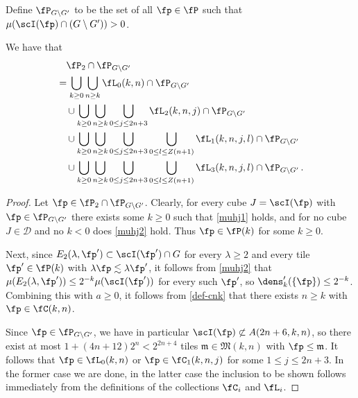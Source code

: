 Define $\fP_{G \setminus G'}$ to be the set of all $\fp \in \fP$ such that $\mu(\scI(\fp) \cap (G \setminus  G')) > 0$.
\begin{lemma}
\label{antichain-decomposition}
    We have that
    \begin{align}
        \label{eq-fp'-decomposition}
        &\quad \fP_2 \cap \fP_{G \setminus G'}\\
        &= \bigcup_{k \ge 0} \bigcup_{n \ge k} \fL_0(k,n) \cap \fP_{G \setminus G'} \\
        &\quad\cup \bigcup_{k \ge 0} \bigcup_{n \ge k}\bigcup_{0 \le j \le 2n+3} \fL_2(k,n,j) \cap \fP_{G \setminus G'}\\
        &\quad\cup \bigcup_{k \ge 0} \bigcup_{n \ge k}\bigcup_{0 \le j \le 2n+3} \bigcup_{0 \le l \le Z(n+1)} \fL_1(k,n,j,l) \cap \fP_{G \setminus G'}\\
        &\quad\cup \bigcup_{k \ge 0} \bigcup_{n \ge k}\bigcup_{0 \le j \le 2n+3} \bigcup_{0 \le l \le Z(n+1)} \fL_3(k,n,j,l)\cap \fP_{G \setminus G'}\,.
    \end{align}
\end{lemma}

\begin{proof}
    Let $\fp \in \fP_2 \cap \fP_{G \setminus G'}$. Clearly, for every cube $J = \scI(\fp)$ with $\fp \in \fP_{G \setminus G'}$ there exists some $k \ge 0$ such that \eqref{muhj1} holds, and for no cube $J \in \mathcal{D}$ and no $k < 0$ does \eqref{muhj2} hold. Thus $\fp \in \fP(k)$ for some $k \ge 0$.

    Next, since $E_2(\lambda, \fp') \subset \scI(\fp')\cap G$ for every $\lambda \ge 2$ and every tile $\fp' \in \fP(k)$ with $\lambda\fp \lesssim \lambda \fp'$, it follows from \eqref{muhj2} that $\mu(E_2(\lambda, \fp')) \le 2^{-k} \mu(\scI(\fp'))$ for every such $\fp'$, so $\dens_k'(\{\fp\}) \le 2^{-k}$. Combining this with $a \ge 0$, it follows from \eqref{def-cnk} that there exists $n\ge k$ with $\fp \in \fC(k,n)$.

    Since $\fp \in \fP_{G \setminus G'}$, we have in particular $\scI(\fp) \not \subset A(2n + 6, k, n)$, so there exist at most $1 + (4n + 12)2^n < 2^{2n+4}$ tiles $\mathfrak{m} \in \mathfrak{M}(k,n)$ with $\fp \le \mathfrak{m}$. It follows that $\fp \in \fL_0(k,n)$ or $\fp \in \fC_1(k,n,j)$ for some $1 \le j \le 2n + 3$. In the former case we are done, in the latter case the inclusion to be shown follows immediately from the definitions of the collections $\fC_i$ and $\fL_i$.
\end{proof}

